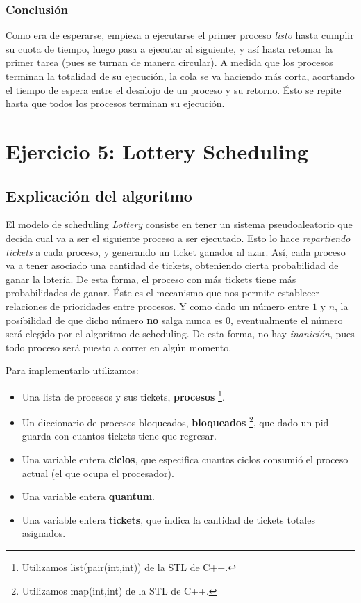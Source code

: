 \documentclass[a4paper]{article}
\begin{document}
\subsubsection{Conclusión}

Como era de esperarse, empieza a ejecutarse el primer proceso \textit{listo}
hasta cumplir su cuota de tiempo, luego pasa a ejecutar al siguiente, y así
hasta retomar la primer tarea (pues se turnan de manera circular). A medida
que los procesos terminan la totalidad de su ejecución, la cola se va
haciendo más corta, acortando el tiempo de espera entre el desalojo de un
proceso y su retorno. Ésto se repite hasta que todos los procesos terminan
su ejecución.

\section{Ejercicio 5: Lottery Scheduling}
\subsection{Explicación del algoritmo}
El modelo de scheduling \textit{Lottery} consiste en tener un sistema
pseudoaleatorio que decida cual va a ser el siguiente proceso a ser
ejecutado. Esto lo hace \textit{repartiendo tickets} a cada proceso, y
generando un ticket ganador al azar. Así, cada
proceso va a tener asociado una cantidad de tickets, obteniendo
cierta probabilidad de ganar la lotería. De esta forma, el proceso con más
tickets tiene más probabilidades de ganar. Éste es el mecanismo que nos
permite establecer relaciones de prioridades entre procesos.
Y como dado un número entre $1$ y $n$, la posibilidad de que dicho número
\textbf{no} salga nunca es $0$, eventualmente el número será elegido por el
algoritmo de scheduling. De esta forma, no hay \textit{inanición}, pues
todo proceso será puesto a correr en algún momento.

Para implementarlo utilizamos:
\begin{itemize}
\item Una lista de procesos y sus tickets, \textbf{procesos}
\footnote{Utilizamos list(pair(int,int)) de la STL de C++.}.
\item Un diccionario de procesos bloqueados, \textbf{bloqueados}
\footnote{Utilizamos map(int,int) de la STL de C++.}, que dado un pid guarda con cuantos
tickets tiene que regresar.
\item Una variable entera \textbf{ciclos}, que especifica cuantos ciclos
consumió el proceso actual (el que ocupa el procesador).
\item Una variable entera \textbf{quantum}.
\item Una variable entera \textbf{tickets}, que indica la cantidad de
tickets totales asignados.
\end{itemize}
\end{document}
